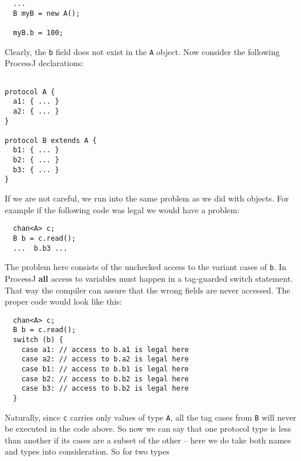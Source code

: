 \documentclass[pdflatex,11pt,letter]{article}
\begin{document}
\begin{verbatim}
  ...
  B myB = new A();
  
  myB.b = 100;
\end{verbatim}
Clearly, the {\tt b} field does not exist in the {\tt A} object. Now consider the following ProcessJ declarations:

\begin{verbatim}

protocol A {
  a1: { ... }
  a2: { ... }
}

protocol B extends A {
  b1: { ... }
  b2: { ... }
  b3: { ... }
}
\end{verbatim}
If we are not careful, we run into the same problem as we did with objects. For example if the following code was legal we would have a problem:
\begin{verbatim}
  chan<A> c;
  B b = c.read();
  ...  b.b3 ...
\end{verbatim}
The problem here consists of the unchecked access to the variant cases of {\tt b}. In ProcessJ {\bf all} access to variables must happen in a tag-guarded switch statement. That way the compiler can assure that the wrong fields are never accessed. The proper code would look like this:
\begin{verbatim}
  chan<A> c;
  B b = c.read();
  switch (b) {
    case a1: // access to b.a1 is legal here
    case a2: // access to b.a2 is legal here
    case b1: // access to b.b1 is legal here
    case b2: // access to b.b2 is legal here
    case b3: // access to b.b2 is legal here
  }
\end{verbatim}
Naturally, since {\tt c} carries only values of type {\tt A}, all the tag cases from {\tt B} will never be executed in the code above. So now we can say that one protocol type is less than another if its cases are a subset of the other -- here we do take both names and types into consideration. So for two types 

%
\end{document}
